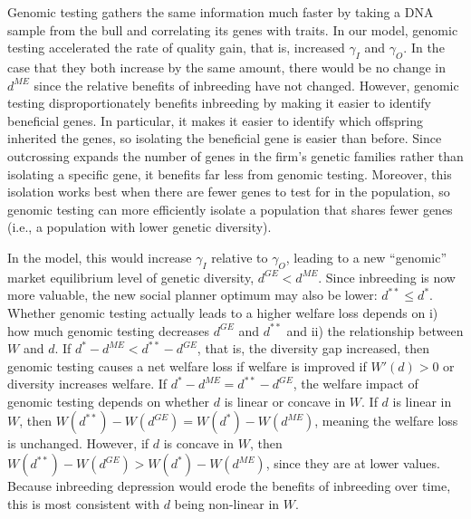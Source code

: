 \documentclass[12pt,letterpaper]{article}
\begin{document}
Genomic testing gathers the same information much faster by taking a DNA sample from the bull and correlating its genes with traits.
In our model, genomic testing accelerated the rate of quality gain, that is, increased $\gamma_I$ and $\gamma_O$. In the case that they both increase by the same amount, there would be no change in $d^{ME}$ since the relative benefits of inbreeding have not changed. However, genomic testing disproportionately benefits inbreeding by making it easier to identify beneficial genes. In particular, it makes it easier to identify which offspring inherited the genes, so isolating the beneficial gene is easier than before. Since outcrossing expands the number of genes in the firm's genetic families rather than isolating a specific gene, it benefits far less from genomic testing. Moreover, this isolation works best when there are fewer genes to test for in the population, so genomic testing can more efficiently isolate a population that shares fewer genes (i.e., a population with lower genetic diversity).

In the model, this would increase $\gamma_I$ relative to $\gamma_O$, leading to a new ``genomic'' market equilibrium level of genetic diversity, $d^{GE}<d^{ME}$. Since inbreeding is now more valuable, the new social planner optimum may also be lower: $d^{**}\leq d^{*}$. Whether genomic testing actually leads to a higher welfare loss depends on i) how much genomic testing decreases $d^{GE}$ and $d^{**}$ and ii) the relationship between $W$ and $d$. If $d^* - d^{ME} < d^{**} -d^{GE}$, that is, the diversity gap increased, then genomic testing causes a net welfare loss if welfare is improved if $W'(d)>0$ or diversity increases welfare. If $d^* - d^{ME} = d^{**} -d^{GE}$, the welfare impact of genomic testing depends on whether $d$ is linear or concave in $W$. If $d$ is linear in $W$, then $W(d^{**}) - W(d^{GE}) = W(d^{*})-W(d^{ME})$, meaning the welfare loss is unchanged. However, if $d$ is concave in $W$, then $W(d^{**}) - W(d^{GE}) > W(d^{*})-W(d^{ME})$, since they are at lower values. Because inbreeding depression would erode the benefits of inbreeding over time, this is most consistent with $d$ being non-linear in $W$.
\end{document}
